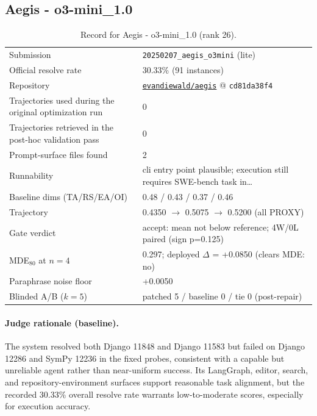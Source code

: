 \subsection{Aegis - o3-mini\_1.0}
\label{app:agent26}
\begin{table}[h]\centering\scriptsize
\caption{Record for Aegis - o3-mini\_1.0 (rank 26).}
\begin{tabular}{lp{8.2cm}}\toprule
Submission & \texttt{20250207\_\allowbreak{}aegis\_\allowbreak{}o3mini} (lite) \\
Official resolve rate & 30.33\% (91 instances) \\
Repository & \href{https://github.com/evandiewald/aegis}{\texttt{evandiewald/aegis}} @ \texttt{cd81da38f4} \\
Trajectories used during the original optimization run & 0 \\
Trajectories retrieved in the post-hoc validation pass & 0 \\
Prompt-surface files found & 2 \\
Runnability & cli entry point plausible; execution still requires SWE-bench task in\ldots{} \\
Baseline dims (TA/RS/EA/OI) & 0.48 / 0.43 / 0.37 / 0.46 \\
Trajectory & 0.4350 $\to$ 0.5075 $\to$ 0.5200 (all PROXY) \\
Gate verdict & accept: mean not below reference; 4W/0L paired (sign p=0.125) \\
MDE$_{80}$ at $n{=}4$ & 0.297; deployed $\Delta$ = +0.0850 (clears MDE: no) \\
Paraphrase noise floor & +0.0050 \\
Blinded A/B ($k{=}5$) & patched 5 / baseline 0 / tie 0 (post-repair) \\
\bottomrule\end{tabular}\end{table}
\paragraph{Judge rationale (baseline).}
The system resolved both Django 11848 and Django 11583 but failed on Django 12286 and SymPy 12236 in the fixed probes, consistent with a capable but unreliable agent rather than near-uniform success. Its LangGraph, editor, search, and repository-environment surfaces support reasonable task alignment, but the recorded 30.33\% overall resolve rate warrants low-to-moderate scores, especially for execution accuracy.
